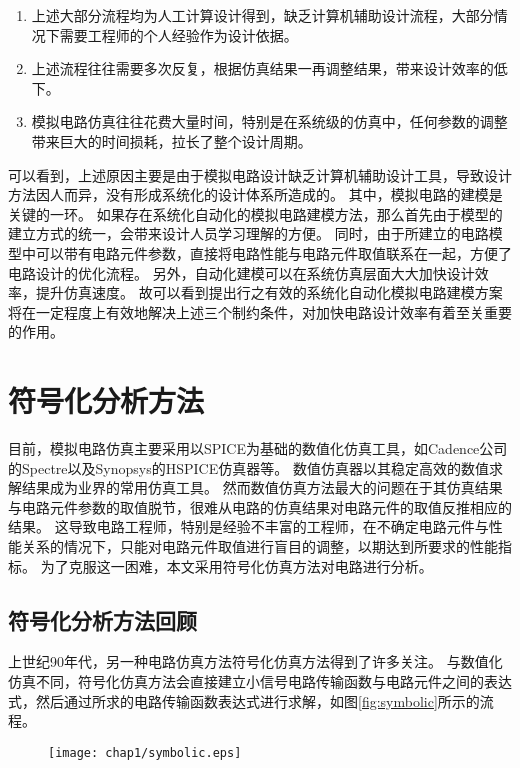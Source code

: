 \begin{enumerate}[label=\emph{\alph*})]
	\item 上述大部分流程均为人工计算设计得到，缺乏计算机辅助设计流程，大部分情况下需要工程师的个人经验作为设计依据。
	\item 上述流程往往需要多次反复，根据仿真结果一再调整结果，带来设计效率的低下。
	\item 模拟电路仿真往往花费大量时间，特别是在系统级的仿真中，任何参数的调整带来巨大的时间损耗，拉长了整个设计周期。
\end{enumerate}

可以看到，上述原因主要是由于模拟电路设计缺乏计算机辅助设计工具，导致设计方法因人而异，没有形成系统化的设计体系所造成的。
其中，模拟电路的建模是关键的一环。
如果存在系统化自动化的模拟电路建模方法，那么首先由于模型的建立方式的统一，会带来设计人员学习理解的方便。
同时，由于所建立的电路模型中可以带有电路元件参数，直接将电路性能与电路元件取值联系在一起，方便了电路设计的优化流程。
另外，自动化建模可以在系统仿真层面大大加快设计效率，提升仿真速度。
故可以看到提出行之有效的系统化自动化模拟电路建模方案将在一定程度上有效地解决上述三个制约条件，对加快电路设计效率有着至关重要的作用。

\section{符号化分析方法}
\label{sec:intro:symbolic}

目前，模拟电路仿真主要采用以SPICE为基础的数值化仿真工具\parencite{Nagel-SPICE-1973}，如Cadence公司的Spectre以及Synopsys的HSPICE仿真器等。
数值仿真器以其稳定高效的数值求解结果成为业界的常用仿真工具。
然而数值仿真方法最大的问题在于其仿真结果与电路元件参数的取值脱节，很难从电路的仿真结果对电路元件的取值反推相应的结果。
这导致电路工程师，特别是经验不丰富的工程师，在不确定电路元件与性能关系的情况下，只能对电路元件取值进行盲目的调整，以期达到所要求的性能指标。
为了克服这一困难，本文采用符号化仿真方法对电路进行分析。

\subsection{符号化分析方法回顾}
\label{subsec:intro:symbolic:review}

上世纪90年代，另一种电路仿真方法符号化仿真方法得到了许多关注\parencite{Lin-Symb}。
与数值化仿真不同，符号化仿真方法会直接建立小信号电路传输函数与电路元件之间的表达式，然后通过所求的电路传输函数表达式进行求解，如图\ref{fig:symbolic}所示的流程。

\begin{figure}[!htp]
	\centering
	\texttt{[image: chap1/symbolic.eps]}
\end{figure}

